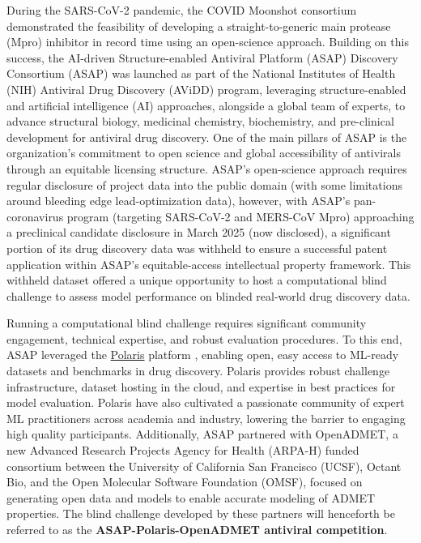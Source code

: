 \documentclass[journal=jcim,manuscript=article]{achemso}
\begin{document}
During the SARS-CoV-2 pandemic, the COVID Moonshot consortium demonstrated the feasibility of developing a straight-to-generic main protease (Mpro) inhibitor in record time using an open-science approach\cite{boby_2023}. Building on this success, the AI-driven Structure-enabled Antiviral Platform (ASAP) Discovery Consortium (ASAP)\cite{ASAP_website} was launched as part of the National Institutes of Health (NIH) Antiviral Drug Discovery (AViDD) program\cite{AVIDD_niaid_2022}, leveraging structure-enabled and artificial intelligence (AI) approaches, alongside a global team of experts, to advance structural biology, medicinal chemistry, biochemistry, and pre-clinical development for antiviral drug discovery. One of the main pillars of ASAP is the organization's commitment to open science and global accessibility of antivirals through an equitable licensing structure\cite{griffen_2024}. ASAP's open-science approach requires regular disclosure of project data into the public domain (with some limitations around bleeding edge lead-optimization data), however, with ASAP's pan-coronavirus program (targeting SARS-CoV-2 and MERS-CoV Mpro\cite{sars_mers_tcp}) approaching a preclinical candidate disclosure in March 2025 (now disclosed)\cite{griffen_2025_acs}, a significant portion of its drug discovery data was withheld to ensure a successful patent application within ASAP's equitable-access intellectual property framework. This withheld dataset offered a unique opportunity to host a computational blind challenge to assess model performance on blinded real-world drug discovery data.


Running a computational blind challenge requires significant community engagement, technical expertise, and robust evaluation procedures. To this end, ASAP leveraged the \hyperlink{https://polarishub.io/}{Polaris} platform \cite{wognum_call_2024, Polaris_website, wognum_polaris-hubpolaris_2025}, enabling open, easy access to ML-ready datasets and benchmarks in drug discovery. Polaris provides robust challenge infrastructure, dataset hosting in the cloud, and expertise in best practices for model evaluation. Polaris have also cultivated a passionate community of expert ML practitioners across academia and industry, lowering the barrier to engaging high quality participants. Additionally, ASAP partnered with OpenADMET, a new Advanced Research Projects Agency for Health (ARPA-H)\cite{ARPAH_website} funded consortium between the University of California San Francisco (UCSF), Octant Bio\cite{Octant_website}, and the Open Molecular Software Foundation (OMSF)\cite{OMSF_website}, focused on generating open data and models to enable accurate modeling of ADMET properties. The blind challenge developed by these partners will henceforth be referred to as the \textbf{ASAP-Polaris-OpenADMET antiviral competition}.
\end{document}
